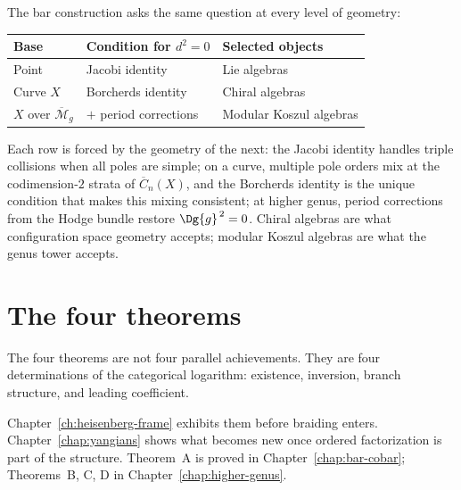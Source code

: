 \begin{remark}
\label{rem:classical-vs-chiral-selection}
The bar construction asks the same question at every level
of geometry:
\begin{center}
\small
\begin{tabular}{lll}
\textbf{Base} & \textbf{Condition for $d^2 = 0$}
  & \textbf{Selected objects} \\
\hline
Point & Jacobi identity & Lie algebras \\
Curve $X$ & Borcherds identity & Chiral algebras \\
$X$ over $\overline{\mathcal{M}}_g$ & $+$ period corrections
  & Modular Koszul algebras
\end{tabular}
\end{center}
Each row is forced by the geometry of the next: the Jacobi
identity handles triple collisions when all poles are simple;
on a curve, multiple pole orders mix at the codimension-$2$
strata of $\overline{C}_n(X)$, and the Borcherds identity is
the unique condition that makes this mixing consistent; at
higher genus, period corrections from the Hodge bundle restore
$\Dg{g}^{\,2} = 0$.  Chiral algebras are what configuration
space geometry accepts; modular Koszul algebras are what the
genus tower accepts.
\end{remark}


\section{The four theorems}
\label{sec:NAP-unifying}
\label{sec:main-results-complete}

The four theorems are not four parallel achievements.  They are four
determinations of the categorical logarithm: existence, inversion,
branch structure, and leading coefficient.

Chapter~\ref{ch:heisenberg-frame} exhibits them before braiding enters.
Chapter~\ref{chap:yangians} shows what becomes new once ordered
factorization is part of the structure.  Theorem~A is proved in
Chapter~\ref{chap:bar-cobar}; Theorems~B, C, D in
Chapter~\ref{chap:higher-genus}.

